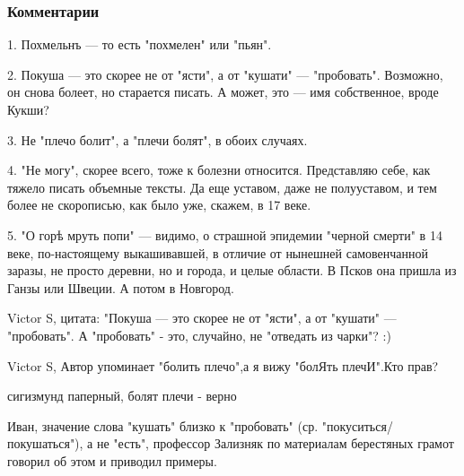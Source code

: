  
 
 
 
 

\subsubsection{Комментарии}
\label{sec:29_11_2020.sites.ru.zen_yandex.yz.valerongrach.1.pop_14_vek.comments}

\begin{itemize}

1. Похмельнъ — то есть "похмелен" или "пьян".

2. Покуша — это скорее не от "ясти", а от "кушати" — "пробовать". Возможно, он снова болеет, но старается писать. А может, это — имя собственное, вроде Кукши?

3. Не "плечо болит", а "плечи болят", в обоих случаях.

4. "Не могу", скорее всего, тоже к болезни относится. Представляю себе, как тяжело писать объемные тексты. Да еще уставом, даже не полууставом, и тем более не скорописью, как было уже, скажем, в 17 веке.

5. "О горѣ мруть попи" — видимо, о страшной эпидемии "черной смерти" в 14 веке,
по-настоящему выкашивавшей, в отличие от нынешней самовенчанной заразы, не
просто деревни, но и города, и целые области. В Псков она пришла из Ганзы или
Швеции. А потом в Новгород.


Victor S, цитата: "Покуша — это скорее не от "ясти", а от "кушати" —
"пробовать". А "пробовать" - это, случайно, не "отведать из чарки"? :)


Victor S, Автор упоминает "болить плечо",а я вижу "болЯть плечИ".Кто прав?


сигизмунд паперный, болят плечи - верно


Иван, значение слова "кушать" близко к "пробовать" (ср.
"покуситься/покушаться"), а не "есть", профессор Зализняк по
материалам берестяных грамот говорил об этом и приводил
примеры.


\end{itemize}
